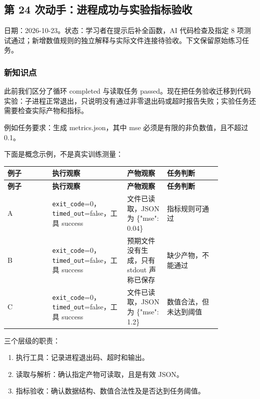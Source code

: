 \documentclass[UTF8,zihao=-4,fontset=fandol]{ctexart}
\begin{document}
\subsection{第 24 次动手：进程成功与实验指标验收}

日期：2026-10-23。状态：学习者在提示后补全函数，AI 代码检查及指定 8 项测试通过；新增数值规则的独立解释与实际文件连接待验收。下文保留原始练习任务。

\subsubsection{新知识点}

此前我们区分了循环 completed 与读取任务 passed。现在把任务验收迁移到代码实验：子进程正常退出，只说明没有通过非零退出码或超时报告失败；实验任务还需要检查实际产物和指标。

例如任务要求：生成 metrics.json，其中 mse 必须是有限的非负数值，且不超过 0.1。

下面是概念示例，不是真实训练测量：

{\small\setlength{\tabcolsep}{4pt}
\renewcommand{\arraystretch}{1.25}
\begin{longtable}{>{\raggedright\arraybackslash}p{0.18\linewidth}>{\raggedright\arraybackslash}p{0.29\linewidth}>{\raggedright\arraybackslash}p{0.16\linewidth}>{\raggedright\arraybackslash}p{0.22\linewidth}}
\toprule
\textbf{例子} & \textbf{执行观察} & \textbf{产物观察} & \textbf{任务判断} \\
\midrule\endfirsthead
\toprule
\textbf{例子} & \textbf{执行观察} & \textbf{产物观察} & \textbf{任务判断} \\
\midrule\endhead
\bottomrule\endfoot
A & \nolinkurl{exit_code}=0，\nolinkurl{timed_out}=false，工具 success & 文件已读取，JSON 为 \{"mse": 0.04\} & 指标规则可通过 \\
B & \nolinkurl{exit_code}=0，\nolinkurl{timed_out}=false，工具 success & 预期文件没有生成，只有 stdout 声称已保存 & 缺少产物，不能通过 \\
C & \nolinkurl{exit_code}=0，\nolinkurl{timed_out}=false，工具 success & 文件已读取，JSON 为 \{"mse": 1.2\} & 数值合法，但未达到阈值 \\
\end{longtable}}

三个层级的职责：

\begin{enumerate}
\item 执行工具：记录进程退出码、超时和输出。
\item 读取与解析：确认指定产物可读取，且是有效 JSON。
\item 指标验收：确认数据结构、数值合法性及是否达到任务阈值。
\end{enumerate}
\end{document}
